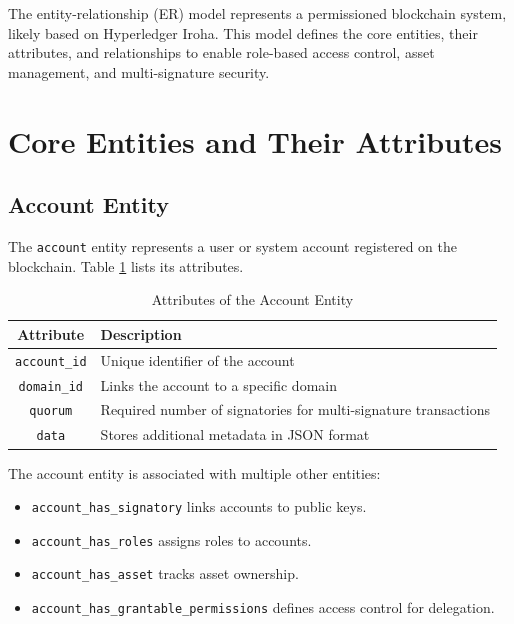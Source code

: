 \documentclass{article}
\begin{document}
The entity-relationship (ER) model represents a permissioned blockchain system, likely based on Hyperledger Iroha. This model defines the core entities, their attributes, and relationships to enable role-based access control, asset management, and multi-signature security.

\section{Core Entities and Their Attributes}
\subsection{Account Entity}
The \texttt{account} entity represents a user or system account registered on the blockchain. Table \ref{tab:account_attributes} lists its attributes.

\begin{table}[h]
      \centering
      \caption{Attributes of the Account Entity}
      \label{tab:account_attributes}
      \begin{tabular}{|c|l|}
            \hline
            \textbf{Attribute}   & \textbf{Description}                                            \\ \hline
            \texttt{account\_id} & Unique identifier of the account                                \\ \hline
            \texttt{domain\_id}  & Links the account to a specific domain                          \\ \hline
            \texttt{quorum}      & Required number of signatories for multi-signature transactions \\ \hline
            \texttt{data}        & Stores additional metadata in JSON format                       \\ \hline
      \end{tabular}
\end{table}

The account entity is associated with multiple other entities:
\begin{itemize}
      \item \texttt{account\_has\_signatory} links accounts to public keys.
      \item \texttt{account\_has\_roles} assigns roles to accounts.
      \item \texttt{account\_has\_asset} tracks asset ownership.
      \item \texttt{account\_has\_grantable\_permissions} defines access control for delegation.
\end{itemize}
\end{document}
